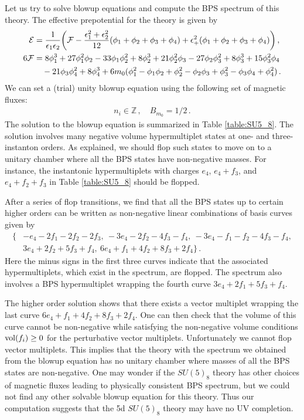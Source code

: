 Let us try to solve blowup equations and compute the BPS spectrum of this theory. The effective prepotential for the theory is given by
\begin{align}
\mathcal{E} 
&= \frac{1}{\epsilon_1 \epsilon_2} \qty( \mathcal{F} -\frac{\epsilon_1^2 + \epsilon_2^2}{12}(\phi_1 + \phi_2 + \phi_3 + \phi_4) + \epsilon_+^2 (\phi_1 + \phi_2 + \phi_3 + \phi_4)) \, ,
\nonumber \\
6\mathcal{F}
&= 8\phi_1^3 + 27\phi_1^2 \phi_2 - 33\phi_1 \phi_2^2 + 8\phi_2^3 + 21\phi_2^2 \phi_3 - 27\phi_2 \phi_3^2 + 8\phi_3^3 + 15\phi_3^2 \phi_4 \nonumber \\
& \quad - 21\phi_3 \phi_4^2 + 8\phi_4^3 + 6m_0 (\phi_1^2 - \phi_1 \phi_2 + \phi_2^2 - \phi_2 \phi_3 + \phi_3^2 - \phi_3 \phi_4 + \phi_4^2) \, .
\end{align}
We can set a (trial) unity blowup equation using the following set of magnetic fluxes:
\begin{align}
n_i \in \mathbb{Z} \, , \quad
B_{m_0} = 1/2 \, .
\end{align}
The solution to the blowup equation is summarized in Table \ref{table:SU5_8}.
The solution  involves many negative volume hypermultiplet states at one- and three-instanton orders. As explained, we should flop such states to move on to a unitary chamber where all the BPS states have non-negative masses. For instance, the instantonic hypermultiplets with charges $e_4$, $e_4+f_3$, and $e_4+f_2+f_3$ in Table \ref{table:SU5_8} should be flopped.

After a series of flop transitions, we find that all the BPS states up to certain higher orders can be written as non-negative linear combinations of basis curves given by
\begin{align}\label{eq:SU58floppedNewBasis}
\{ &-e_4 - 2f_1 - 2f_2 - 2f_3,\ -3e_4 - 2f_2 - 4f_3 - f_4,\  -3e_4 - f_1 - f_2 - 4f_3 -f_4, \nonumber \\
&3e_4 + 2f_2 + 5f_3 + f_4,\   6e_4 + f_1 + 4f_2 + 8f_3 + 2f_4  \} \, .
\end{align}
Here the minus signs in the first three curves indicate that the associated hypermultiplets, which exist in the spectrum, are flopped. The spectrum also involves a BPS hypermultiplet wrapping the fourth curve $ 3e_4 + 2f_1 + 5f_3 + f_4 $.

The higher order solution shows that there exists a vector multiplet wrapping the last curve $ 6e_4 + f_1 + 4f_2 + 8f_3 + 2f_4 $. One can then check that the volume of this curve cannot be non-negative while satisfying the non-negative volume conditions $ \operatorname{vol}(f_i) \geq 0 $ for the perturbative vector multiplets. Unfortunately we cannot flop vector multiplets. This implies that the theory with the spectrum we obtained from the blowup equation has no unitary chamber where masses of all the BPS states are non-negative. One may wonder if the $SU(5)_8$ theory has other choices of magnetic fluxes leading to physically consistent BPS spectrum, but we could not find any other solvable blowup equation for this theory. Thus our computation suggests that the 5d $ SU(5)_8 $ theory may have no UV completion.